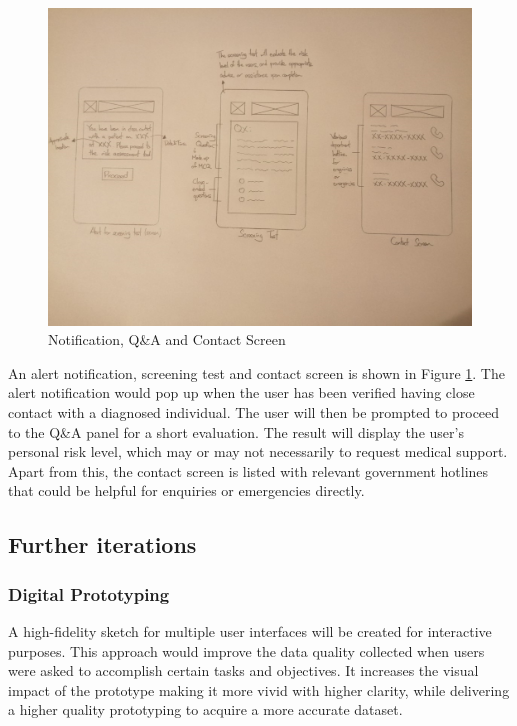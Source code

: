       \begin{figure}[H]
        \centering
        \includegraphics[width=18cm]{img/low-fidelity-prototype/sketch-3.png}
        \caption{Notification, Q\&A and Contact Screen}
        \label{fig:prototype-03}
      \end{figure}
      
      \par An alert notification, screening test and contact screen is shown in Figure \ref{fig:prototype-03}. The alert notification would pop up when the user has been verified having close contact with a diagnosed individual. The user will then be prompted to proceed to the Q\&A panel for a short evaluation. The result will display the user’s personal risk level, which may or may not necessarily to request medical support. Apart from this, the contact screen is listed with relevant government hotlines that could be helpful for enquiries or emergencies directly.

    \subsection{Further iterations}
      \subsubsection{Digital Prototyping}
        \par A high-fidelity sketch for multiple user interfaces will be created for interactive purposes. This approach would improve the data quality collected when users were asked to accomplish certain tasks and objectives. It increases the visual impact of the prototype making it more vivid with higher clarity, while delivering a higher quality prototyping to acquire a more accurate dataset.

